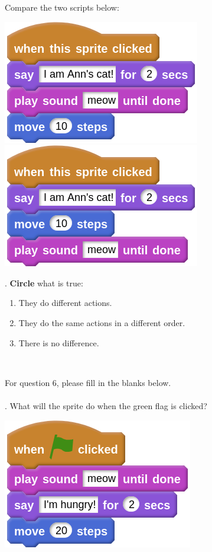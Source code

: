 \documentclass[letterpaper,12pt]{article}
\begin{document}
\noindent Compare the two scripts below:
\begin{center}
\includegraphics[scale=.4,valign=t]{q5_script0.png} \hspace{0.5in}
\includegraphics[scale=.4,valign=t]{q5_script1.png}
\end{center}

. \textbf{Circle} what is true:
\renewcommand{\theenumi}{\Alph{enumi}}
\begin{enumerate}
\item They do different actions. 
\item They do the same actions in a different order.
\item There is no difference.
\end{enumerate}
\noindent \dotfill \\

\newpage

\noindent For question 6, please fill in the blanks below. \\ \\
. What will the sprite do when the green flag is clicked?
\begin{center}
\includegraphics[scale=.4]{q6_script0.png}
\end{center}
\end{document}
